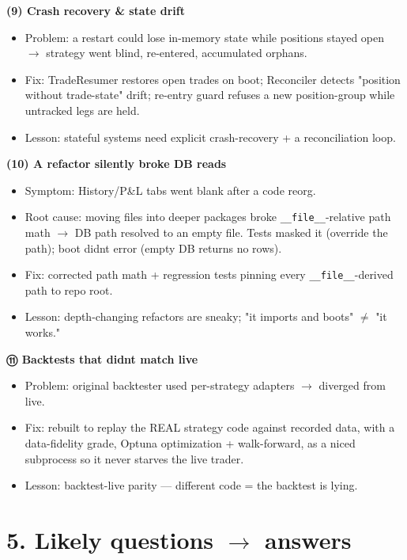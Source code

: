 \documentclass[11pt]{article}
\providecommand{\tightlist}{\setlength{\itemsep}{1pt}\setlength{\parskip}{0pt}}
\begin{document}
\textbf{(9) Crash recovery \& state drift}

\begin{itemize}
\tightlist
\item
  Problem: a restart could lose in-memory state while positions stayed open \(\rightarrow\) strategy went blind, re-entered, accumulated orphans.
\item
  Fix: TradeResumer restores open trades on boot; Reconciler detects "position without trade-state" drift; re-entry guard refuses a new position-group while untracked legs are held.
\item
  Lesson: stateful systems need explicit crash-recovery + a reconciliation loop.
\end{itemize}

\textbf{(10) A refactor silently broke DB reads}

\begin{itemize}
\tightlist
\item
  Symptom: History/P\&L tabs went blank after a code reorg.
\item
  Root cause: moving files into deeper packages broke \texttt{\_\_file\_\_}-relative path math \(\rightarrow\) DB path resolved to an empty file. Tests masked it (override the path); boot didn\textquotesingle t error (empty DB returns no rows).
\item
  Fix: corrected path math + regression tests pinning every \texttt{\_\_file\_\_}-derived path to repo root.
\item
  Lesson: depth-changing refactors are sneaky; "it imports and boots" \(\neq\) "it works."
\end{itemize}

\textbf{⑪ Backtests that didn\textquotesingle t match live}

\begin{itemize}
\tightlist
\item
  Problem: original backtester used per-strategy adapters \(\rightarrow\) diverged from live.
\item
  Fix: rebuilt to replay the REAL strategy code against recorded data, with a data-fidelity grade, Optuna optimization + walk-forward, as a niced subprocess so it never starves the live trader.
\item
  Lesson: backtest-live parity --- different code = the backtest is lying.
\end{itemize}

\section{\texorpdfstring{5. Likely questions \(\rightarrow\) answers}{5. Likely questions \textbackslash rightarrow answers}}\label{5-likely-questions-rightarrow-answers}
\end{document}
